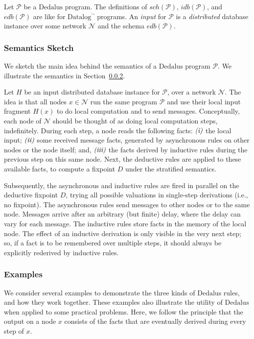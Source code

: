 \documentclass{tlp}
\newcommand{\langname}[1]{\text{#1}}  \newcommand{\pred}[1]{\mathtt{#1}}  \newcommand{\fname}[1]{\mathit{#1}}  \newcommand{\sq}[1]{`{#1}'}
\newcommand{\dedalus}{\langname{Dedalus}}
\newcommand{\datalogneg}{\langname{Datalog}^{\neg}}
\newcommand{\romII}{\rom{ii}}
\newcommand{\romIII}{\rom{iii}}
\newcommand{\ded}{\mathcal{P}}
\newcommand{\idb}[1]{\fname{idb}(#1)}
\newcommand{\edb}[1]{\fname{edb}(#1)}
\newcommand{\schof}[1]{\fname{sch}(#1)}
\newcommand{\nw}{\mathcal{N}}
\begin{document}
Let $\ded$ be a $\dedalus$ program. The definitions of $\schof{\ded}$,
$\idb{\ded}$, and $\edb{\ded}$ are like for $\datalogneg$ programs.
An \emph{input} for $\ded$ is a \emph{distributed} database instance
over some network $\nw$ and the schema $\edb{\ded}$. 

\subsubsection{Semantics Sketch}

We sketch the main idea behind the semantics of a $\dedalus$ program
$\ded$. We illustrate the semantics in Section~\ref{sub:examples}.

Let $H$ be an input distributed database instance for $\ded$,
over a network $\nw$. 
The idea is that all nodes $x\in\nw$ run the same program $\ded$
and use their local input fragment $H(x)$ to do local computation
and to send messages. Conceptually, each node of $\nw$ should be
thought of as doing local computation steps, indefinitely. During
each step, a node reads the following facts: $\text{\emph{(i)}}$ the local input;
$\romII$ some received message facts, generated by asynchronous rules
on other nodes or the node itself; and, $\romIII$ the facts derived
by inductive rules during the previous step on this same node. Next,
the deductive rules are applied to these available facts, to compute
a fixpoint $D$ under the stratified semantics. 

Subsequently, the asynchronous and inductive rules are fired in parallel on the deductive fixpoint $D$, trying all possible valuations in single-step
derivations (i.e., no fixpoint). The asynchronous rules send messages
to other nodes or to the same node. Messages arrive after an arbitrary
(but finite) delay, where the delay can vary for each message. The
inductive rules store facts in the memory of the local node. The effect
of an inductive derivation is only visible in the very next step;
so, if a fact is to be remembered over multiple steps, it should always
be explicitly rederived by inductive rules.

\subsubsection{Examples}
\label{sub:examples}

We consider several examples to demonstrate the three kinds of $\dedalus$ rules, and how they work together. 
These examples also illustrate the utility of $\dedalus$ when applied to some practical problems.
Here, we follow the principle that the
    output on a node $x$ consists of the facts that are eventually derived during every step of $x$.
\end{document}

